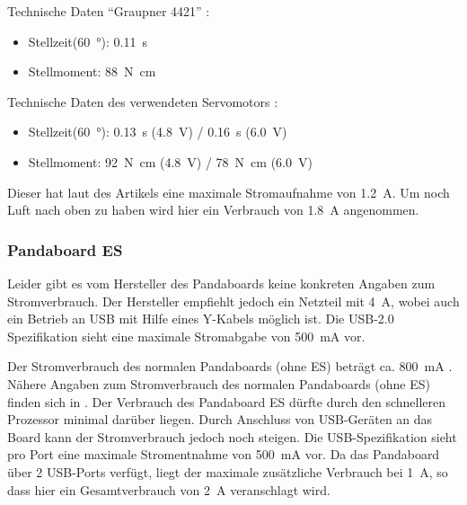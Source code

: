 
Technische Daten ``Graupner 4421'' \cite{website-servo-vergleich-dat}:
\begin{itemize}
 \item Stellzeit(\SI{60}{\degree}): \SI{0,11}{\second}
 \item Stellmoment: \SI{88}{\newton\centi\meter} 
\end{itemize}


Technische Daten des verwendeten Servomotors \cite{website-servo-dat}:
\begin{itemize}
 \item Stellzeit(\SI{60}{\degree}): \SI{0,13}{\second} (\SI{4,8}{\volt}) / \SI{0,16}{\second} (\SI{6,0}{\volt})
 \item Stellmoment: \SI{92}{\newton\centi\meter} (\SI{4,8}{\volt}) / \SI{78}{\newton\centi\meter} (\SI{6,0}{\volt})
\end{itemize}



Dieser hat laut des Artikels eine maximale Stromaufnahme von \SI{1,2}{\ampere}. Um noch Luft nach oben zu haben wird hier ein Verbrauch von 
\SI{1,8}{\ampere} angenommen.

\subsubsection{Pandaboard ES}
Leider gibt es vom Hersteller des Pandaboards keine konkreten Angaben zum Stromverbrauch. Der Hersteller empfiehlt jedoch ein
Netzteil mit \SI{4}{\ampere}\cite{website-panda-supply}, wobei auch ein Betrieb an USB mit Hilfe eines Y-Kabels möglich ist. Die USB-2.0 Spezifikation\cite{website-usb-spec} sieht eine maximale 
Stromabgabe von \SI{500}{\milli\ampere} vor.

Der Stromverbrauch des normalen Pandaboards (ohne ES) beträgt ca. \SI{800}{\milli\ampere} \cite{website-panda-power}.
Nähere Angaben zum Stromverbrauch des normalen Pandaboards (ohne ES) finden sich in \cite{website-panda-power}.
Der Verbrauch des Pandaboard ES dürfte durch den schnelleren Prozessor minimal darüber liegen. 
Durch Anschluss von USB-Geräten an das Board kann der Stromverbrauch jedoch noch steigen. Die USB-Spezifikation \cite{website-usb-spec}
sieht pro Port eine maximale Stromentnahme von \SI{500}{\milli\ampere} vor. Da das Pandaboard über 2 USB-Ports verfügt, liegt der maximale zusätzliche Verbrauch bei \SI{1}{\ampere},
so dass hier ein Gesamtverbrauch von \SI{2}{\ampere} veranschlagt wird.

